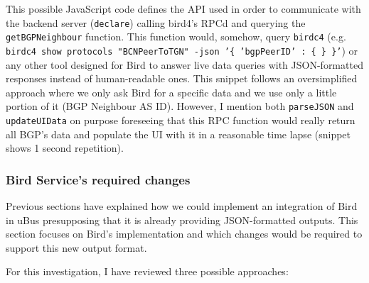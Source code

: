 This possible JavaScript code defines the API used in order to communicate with the backend server (\texttt{declare}) calling bird4's RPCd and querying the \texttt{getBGPNeighbour} function. This function would, somehow, query \texttt{birdc4} (e.g. \texttt{birdc4 show protocols "BCNPeerToTGN" -json '\{ 'bgpPeerID' : \{ \} \}'}) or any other tool designed for Bird to answer live data queries with JSON-formatted responses instead of human-readable ones.
This snippet follows an oversimplified approach where we only ask Bird for a specific data and we use only a little portion of it (BGP Neighbour AS ID). However, I mention both \texttt{parseJSON} and \texttt{updateUIData} on purpose foreseeing that this RPC function would really return all BGP's data and populate the UI with it in a reasonable time lapse (snippet shows 1 second repetition).

\subsubsection{Bird Service's required changes}
\label{sub:sub:birdex}
Previous sections have explained how we could implement an integration of Bird in uBus presupposing that it is already providing JSON-formatted outputs.
This section focuses on Bird's implementation and which changes would be required to support this new output format.

For this investigation, I have reviewed three possible approaches:

